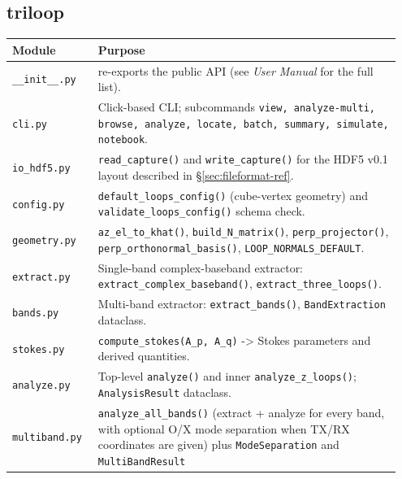 \documentclass[11pt]{article}
\begin{document}
\subsection{\textsf{triloop}}

\begin{tabular}{p{0.21\linewidth}p{0.74\linewidth}}
\toprule
\textbf{Module} & \textbf{Purpose} \\\midrule
\texttt{\_\_init\_\_.py} & re-exports the public API (see
                    \textit{User Manual} for the full list). \\
\texttt{cli.py}   & Click-based CLI; subcommands
                    \texttt{view, analyze-multi, browse, analyze,
                    locate, batch, summary, simulate, notebook}. \\
\texttt{io\_hdf5.py}  & \texttt{read\_capture()} and
                    \texttt{write\_capture()} for the HDF5 v0.1 layout
                    described in \S\ref{sec:fileformat-ref}. \\
\texttt{config.py}    & \texttt{default\_loops\_config()} (cube-vertex
                    geometry) and \texttt{validate\_loops\_config()}
                    schema check. \\
\texttt{geometry.py}  & \texttt{az\_el\_to\_khat()},
                    \texttt{build\_N\_matrix()},
                    \texttt{perp\_projector()},
                    \texttt{perp\_orthonormal\_basis()},
                    \texttt{LOOP\_NORMALS\_DEFAULT}. \\
\texttt{extract.py}   & Single-band complex-baseband extractor:
                    \texttt{extract\_complex\_baseband()},
                    \texttt{extract\_three\_loops()}. \\
\texttt{bands.py}     & Multi-band extractor:
                    \texttt{extract\_bands()},
                    \texttt{BandExtraction} dataclass. \\
\texttt{stokes.py}    & \texttt{compute\_stokes(A\_p, A\_q)} ->
                    Stokes parameters and derived quantities. \\
\texttt{analyze.py}   & Top-level \texttt{analyze()} and inner
                    \texttt{analyze\_z\_loops()}; \texttt{AnalysisResult}
                    dataclass. \\
\texttt{multiband.py} & \texttt{analyze\_all\_bands()} (extract +
                    analyze for every band, with optional O/X mode
                    separation when TX/RX coordinates are given) plus
                    \texttt{ModeSeparation} and \texttt{MultiBandResult}

\end{tabular}
\end{document}
